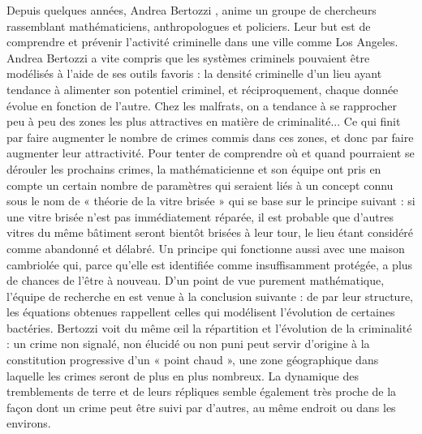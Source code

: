 \documentclass[12pt,a4paper]{article}
\begin{document}
Depuis quelques années, Andrea Bertozzi \cite{Berto}, anime un groupe de chercheurs rassemblant mathématiciens, anthropologues et policiers. Leur but est de comprendre et prévenir l’activité criminelle dans une ville comme Los Angeles. Andrea Bertozzi a vite compris que les systèmes criminels pouvaient être modélisés à l'aide de ses outils favoris : la densité criminelle d'un lieu ayant tendance à alimenter son potentiel criminel, et réciproquement, chaque donnée évolue en fonction de l'autre. Chez les malfrats, on a tendance à se rapprocher peu à peu des zones les plus attractives en matière de criminalité... Ce qui finit par faire augmenter le nombre de crimes commis dans ces zones, et donc par faire augmenter leur attractivité. Pour tenter de comprendre où et quand pourraient se dérouler les prochains crimes, la mathématicienne et son équipe ont pris en compte un certain nombre de paramètres qui seraient liés à un concept connu sous le nom de « théorie de la vitre brisée » \cite{Vitres} qui se base sur le principe suivant : si une vitre brisée n'est pas immédiatement réparée, il est probable que d'autres vitres du même bâtiment seront bientôt brisées à leur tour, le lieu étant considéré comme abandonné et délabré. Un principe qui fonctionne aussi avec une maison cambriolée qui, parce qu'elle est identifiée comme insuffisamment protégée, a plus de chances de l'être à nouveau. D'un point de vue purement mathématique, l'équipe de recherche en est venue à la conclusion suivante : de par leur structure, les équations obtenues rappellent celles qui modélisent l'évolution de certaines bactéries. Bertozzi voit du même œil la répartition et l'évolution de la criminalité : un crime non signalé, non élucidé ou non puni peut servir d'origine à la constitution progressive d'un « point chaud », une zone géographique dans laquelle les crimes seront de plus en plus nombreux. La dynamique des tremblements de terre et de leurs répliques semble également très proche de la façon dont un crime peut être suivi par d'autres, au même endroit ou dans les environs.
\end{document}
